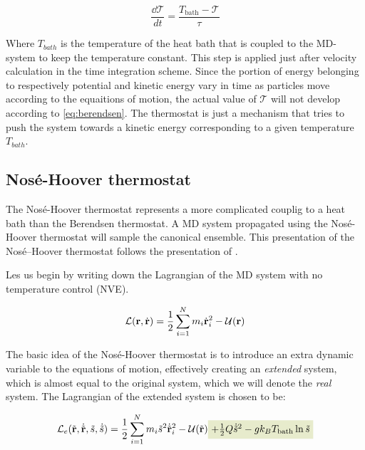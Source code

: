 \begin{equation}
\frac{\dd \mathcal{T}}{dt} = \frac{T_{\text{bath}}-\mathcal{T}}{\tau}
\label{eq:berendsen}
\end{equation}

Where $T_{bath}$ is the temperature of the heat bath that is coupled to the MD-system to keep the temperature constant. This step is applied just after velocity calculation in the time integration scheme. Since the portion of energy belonging to respectively potential and kinetic energy vary in time as particles move according to the equaitions of motion, the actual value of $\mathcal{T}$ will not develop according to \ref{eq:berendsen}. The thermostat is just a mechanism that tries to push the system towards a kinetic energy corresponding to a given temperature $T_{bath}$.

\subsection{Nosé-Hoover thermostat}
The Nosé-Hoover thermostat represents a more complicated couplig to a heat bath than the Berendsen thermostat. A MD system propagated using the Nosé-Hoover thermostat will sample the canonical ensemble. This presentation of the Nosé--Hoover thermostat follows the presentation of \citet{Hunenberger2005}.


Les us begin by writing down the Lagrangian of the MD system with no temperature control (NVE).

\begin{equation}
	\mathcal{L}(\mathbf{r}, \dot{\mathbf{r}}) = \frac{1}{2} \sum_{i=1}^N m_i \dot{\mathbf{r}}_i^2 - \mathcal{U(\mathbf{r})}
\end{equation}

The basic idea of the Nosé-Hoover thermostat is to introduce an extra dynamic variable to the equations of motion, effectively creating an \emph{extended} system, which is almost equal to the original system, which we will denote the \emph{real} system. The Lagrangian of the extended system is chosen to be:


\begin{equation}
	\mathcal{L}_e(\tilde\rvec, \dot{\tilde\rvec}, \tilde{s}, \dot{\tilde s}) = \frac{1}{2}\sum_{i=1}^N m_i \tilde s^2 \dot{\tilde\rvec}_i^2 - \mathcal{U}(\tilde\rvec) 
	\tikz[baseline] {
		\node [fill=green!20, anchor=base] (t1) {$+ \frac{1}{2} Q \dot{\tilde s}^2 - gk_BT_{\text{bath}} \ln\tilde s $};
	}
\end{equation}


